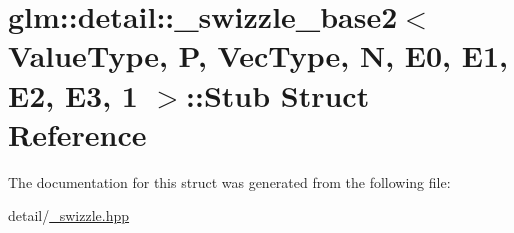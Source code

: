 \hypertarget{structglm_1_1detail_1_1__swizzle__base2_3_01ValueType_00_01P_00_01VecType_00_01N_00_01E0_00_01E17d6926f6e6f474ef79d271c7c59bd480}{\section{glm\-:\-:detail\-:\-:\-\_\-swizzle\-\_\-base2$<$ Value\-Type, P, Vec\-Type, N, E0, E1, E2, E3, 1 $>$\-:\-:Stub Struct Reference}
\label{structglm_1_1detail_1_1__swizzle__base2_3_01ValueType_00_01P_00_01VecType_00_01N_00_01E0_00_01E17d6926f6e6f474ef79d271c7c59bd480}
}


The documentation for this struct was generated from the following file\-:\begin{DoxyCompactItemize}
\item 
detail/\hyperlink{__swizzle_8hpp}{\-\_\-swizzle.\-hpp}\end{DoxyCompactItemize}
